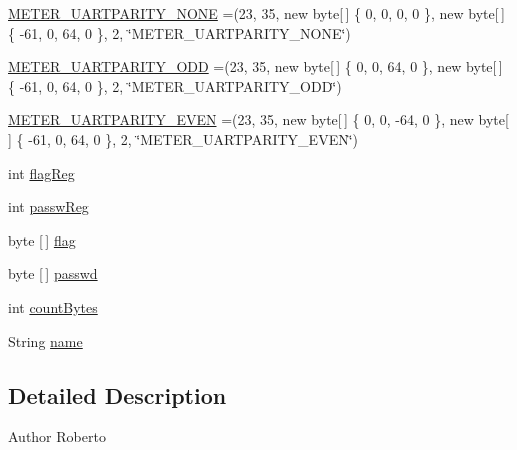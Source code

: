 \begin{DoxyCompactItemize}
\item 
\hyperlink{enumcom_1_1eneri_1_1scorpio__metertool_1_1hardwarelayer_1_1_flags_passwords_acf86cd33384ff474b74bdd98f4518aa1}{M\+E\+T\+E\+R\+\_\+\+U\+A\+R\+T\+P\+A\+R\+I\+T\+Y\+\_\+\+N\+O\+NE} =(23, 35, new byte\mbox{[}$\,$\mbox{]} \{ 0, 0, 0, 0 \}, new byte\mbox{[}$\,$\mbox{]} \{ -\/61, 0, 64, 0 \}, 2, \char`\"{}M\+E\+T\+E\+R\+\_\+\+U\+A\+R\+T\+P\+A\+R\+I\+T\+Y\+\_\+\+N\+O\+NE\char`\"{})
\item 
\hyperlink{enumcom_1_1eneri_1_1scorpio__metertool_1_1hardwarelayer_1_1_flags_passwords_a4ed7ede749f30dbaf4f48e32fa5e851d}{M\+E\+T\+E\+R\+\_\+\+U\+A\+R\+T\+P\+A\+R\+I\+T\+Y\+\_\+\+O\+DD} =(23, 35, new byte\mbox{[}$\,$\mbox{]} \{ 0, 0, 64, 0 \}, new byte\mbox{[}$\,$\mbox{]} \{ -\/61, 0, 64, 0 \}, 2, \char`\"{}M\+E\+T\+E\+R\+\_\+\+U\+A\+R\+T\+P\+A\+R\+I\+T\+Y\+\_\+\+O\+DD\char`\"{})
\item 
\hyperlink{enumcom_1_1eneri_1_1scorpio__metertool_1_1hardwarelayer_1_1_flags_passwords_ae28a24bc44a83878d7d91642ed49d26c}{M\+E\+T\+E\+R\+\_\+\+U\+A\+R\+T\+P\+A\+R\+I\+T\+Y\+\_\+\+E\+V\+EN} =(23, 35, new byte\mbox{[}$\,$\mbox{]} \{ 0, 0, -\/64, 0 \}, new byte\mbox{[}$\,$\mbox{]} \{ -\/61, 0, 64, 0 \}, 2, \char`\"{}M\+E\+T\+E\+R\+\_\+\+U\+A\+R\+T\+P\+A\+R\+I\+T\+Y\+\_\+\+E\+V\+EN\char`\"{})
\item 
int \hyperlink{enumcom_1_1eneri_1_1scorpio__metertool_1_1hardwarelayer_1_1_flags_passwords_a001e565e1f5776b635d5818b8119153e}{flag\+Reg}
\item 
int \hyperlink{enumcom_1_1eneri_1_1scorpio__metertool_1_1hardwarelayer_1_1_flags_passwords_a969aae4a7f0d3ce531f185d6763ed492}{passw\+Reg}
\item 
byte \mbox{[}$\,$\mbox{]} \hyperlink{enumcom_1_1eneri_1_1scorpio__metertool_1_1hardwarelayer_1_1_flags_passwords_a72922e42fbe4cd1de6169f3a4c9d6c82}{flag}
\item 
byte \mbox{[}$\,$\mbox{]} \hyperlink{enumcom_1_1eneri_1_1scorpio__metertool_1_1hardwarelayer_1_1_flags_passwords_ae4283752c1661285ff5a51ebb6d7e8bd}{passwd}
\item 
int \hyperlink{enumcom_1_1eneri_1_1scorpio__metertool_1_1hardwarelayer_1_1_flags_passwords_a607026b942064728343b0d346077c71d}{count\+Bytes}
\item 
String \hyperlink{enumcom_1_1eneri_1_1scorpio__metertool_1_1hardwarelayer_1_1_flags_passwords_a7ed6b058098c36400945a3d7241190d9}{name}
\end{DoxyCompactItemize}


\subsection{Detailed Description}
\begin{DoxyAuthor}{Author}
Roberto 
\end{DoxyAuthor}


